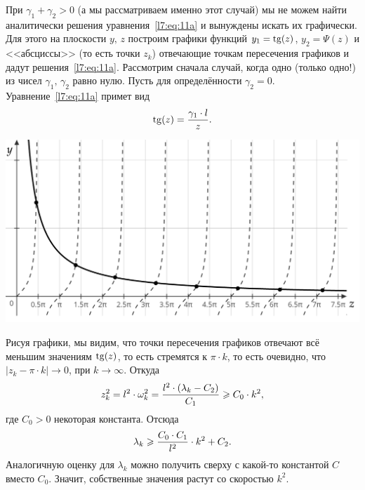 \noindent При $\gamma_1+\gamma_2>0$ (а мы рассматриваем именно этот случай) мы не можем найти аналитически решения уравнения~\eqref{l7:eq:11a} и вынуждены искать их графически. Для этого на плоскости $y,\,z$ построим графики функций $y_1=\operatorname{tg}(z)$, $y_2=\Psi(z)$ и  <<абсциссы>> (то есть точки $z_k$) отвечающие точкам пересечения графиков и дадут решения~\eqref{l7:eq:11a}. Рассмотрим сначала случай, когда одно (только одно!) из чисел $\gamma_1,\,\gamma_2$ равно нулю. Пусть для определённости $\gamma_2=0$. Уравнение~\eqref{l7:eq:11a} примет вид
\begin{equation*}
	\hfill\Tang(z)=\dfrac{\gamma_1\cdot l}{z}.\hfill
\end{equation*}
\begin{center}
	\includegraphics[width=0.7\linewidth]{picture1}
\end{center}
Рисуя графики, мы видим, что точки пересечения графиков отвечают всё меньшим значениям $\operatorname{tg}(z)$, то есть стремятся к $\pi\cdot k$, то есть очевидно, что $|z_k-\pi\cdot  k|\to0$, при $k\to\infty$. Откуда
\begin{equation*}
	\hfill z_k^2=l^2\cdot\omega_k^2=\dfrac{l^2\cdot(\lambda_k-C_2)}{C_1}\geqslant C_0\cdot k^2,\hfill
\end{equation*}	
где $C_0>0$ некоторая константа. Отсюда
\begin{equation*}
	\hfill\lambda_k\geqslant\frac{C_0\cdot C_1}{l^2}\cdot k^2+C_2.\hfill
\end{equation*}
Аналогичную оценку для $\lambda_k$ можно получить сверху с какой-то константой $C$ вместо $C_0$. Значит, собственные значения растут со скоростью $k^2$.

